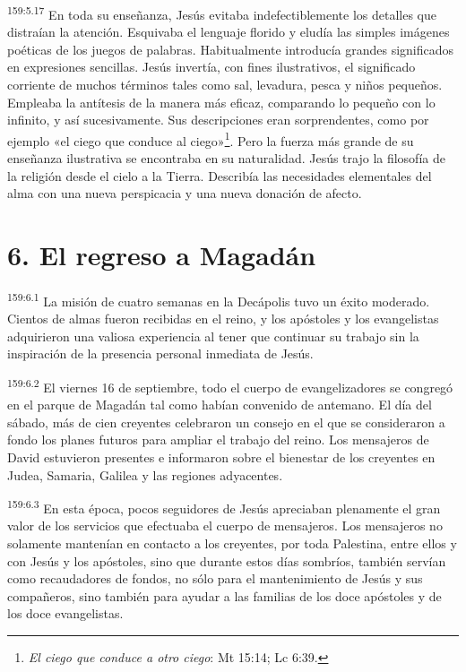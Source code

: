 \par 
\textsuperscript{159:5.17} En toda su enseñanza, Jesús evitaba indefectiblemente los detalles que distraían la atención. Esquivaba el lenguaje florido y eludía las simples imágenes poéticas de los juegos de palabras. Habitualmente introducía grandes significados en expresiones sencillas. Jesús invertía, con fines ilustrativos, el significado corriente de muchos términos tales como sal, levadura, pesca y niños pequeños. Empleaba la antítesis de la manera más eficaz, comparando lo pequeño con lo infinito, y así sucesivamente. Sus descripciones eran sorprendentes, como por ejemplo «el ciego que conduce al ciego»\footnote{\textit{El ciego que conduce a otro ciego}: Mt 15:14; Lc 6:39.}. Pero la fuerza más grande de su enseñanza ilustrativa se encontraba en su naturalidad. Jesús trajo la filosofía de la religión desde el cielo a la Tierra. Describía las necesidades elementales del alma con una nueva perspicacia y una nueva donación de afecto.

\section*{6. El regreso a Magadán}
\par 
\textsuperscript{159:6.1} La misión de cuatro semanas en la Decápolis tuvo un éxito moderado. Cientos de almas fueron recibidas en el reino, y los apóstoles y los evangelistas adquirieron una valiosa experiencia al tener que continuar su trabajo sin la inspiración de la presencia personal inmediata de Jesús.

\par 
\textsuperscript{159:6.2} El viernes 16 de septiembre, todo el cuerpo de evangelizadores se congregó en el parque de Magadán tal como habían convenido de antemano. El día del sábado, más de cien creyentes celebraron un consejo en el que se consideraron a fondo los planes futuros para ampliar el trabajo del reino. Los mensajeros de David estuvieron presentes e informaron sobre el bienestar de los creyentes en Judea, Samaria, Galilea y las regiones adyacentes.

\par 
\textsuperscript{159:6.3} En esta época, pocos seguidores de Jesús apreciaban plenamente el gran valor de los servicios que efectuaba el cuerpo de mensajeros. Los mensajeros no solamente mantenían en contacto a los creyentes, por toda Palestina, entre ellos y con Jesús y los apóstoles, sino que durante estos días sombríos, también servían como recaudadores de fondos, no sólo para el mantenimiento de Jesús y sus compañeros, sino también para ayudar a las familias de los doce apóstoles y de los doce evangelistas.

